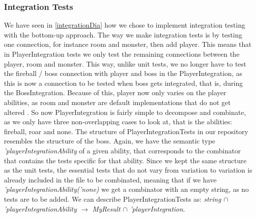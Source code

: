 \subsubsection{Integration Tests}
We have seen in \autoref{integrationDia} how we chose to implement integration testing with the bottom-up approach. The way we make integration tests is by testing one connection, for instance room and monster, then add player. This means that in PlayerIntegration tests we only test the remaining connections between the player, room and monster. This way, unlike unit tests, we no longer have to test the fireball / boss connection with player and boss in the PlayerIntegration, as this is now a connection to be tested when boss gets integrated, that is, during the BossIntegration. Because of this, player now only varies on the player abilities, as room and monster are default implementations that do not get altered . So now PlayerIntegration is fairly simple to decompose and combinate, as we only have three non-overlapping cases to look at, that is the abilities: fireball, roar and none. The structure of PlayerIntegrationTests in our repository resembles the structure of the boss. Again, we have the semantic type \textit{'playerIntegrationAbility} of a given ability, that corresponds to the combinator that contains the tests specific for that ability. Since we kept the same structure as the unit tests, the essential tests that do not vary from variation to variation is already included in the file to be combinated, meaning that if we have \textit{'playerIntegrationAbility('none)} we get a combinator with an empty string, as no tests are to be added. We can describe PlayerIntegrationTests as: \textit{string $\cap$ 'playerIntegrationAbility $\to$ MyResult $\cap$ 'playerIntegration}. \\
